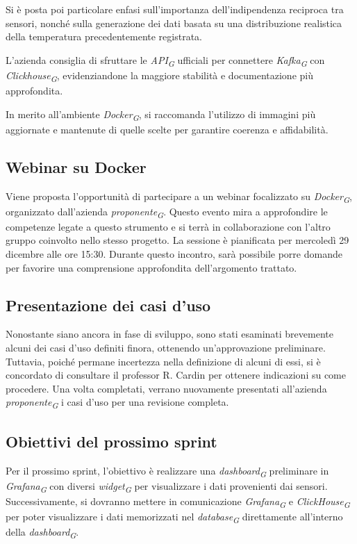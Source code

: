 \documentclass{article}
\begin{document}
Si è posta poi particolare enfasi sull'importanza dell'indipendenza reciproca tra sensori, nonché sulla generazione dei dati basata su una distribuzione realistica della temperatura precedentemente registrata.  

L'azienda consiglia di sfruttare le \textit{API}\textsubscript{\textit{G}} ufficiali per connettere \textit{Kafka}\textsubscript{\textit{G}} con \textit{Clickhouse}\textsubscript{\textit{G}}, evidenziandone la maggiore stabilità e documentazione più approfondita.  

In merito all'ambiente \textit{Docker}\textsubscript{\textit{G}}, si raccomanda l'utilizzo di immagini più aggiornate e mantenute di quelle scelte per garantire coerenza e affidabilità.  

\subsection{Webinar su Docker}
Viene proposta l'opportunità di partecipare a un webinar focalizzato su \textit{Docker}\textsubscript{\textit{G}}, organizzato dall'azienda \textit{proponente}\textsubscript{\textit{G}}. Questo evento mira a approfondire le competenze legate a questo strumento e si terrà in collaborazione con l'altro gruppo coinvolto nello stesso progetto.  
La sessione è pianificata per mercoledì 29 dicembre alle ore 15:30. Durante questo incontro, sarà possibile porre domande per favorire una comprensione approfondita dell'argomento trattato. 

\subsection{Presentazione dei casi d'uso}
Nonostante siano ancora in fase di sviluppo, sono stati esaminati brevemente alcuni dei casi d'uso definiti finora, ottenendo un'approvazione preliminare.
Tuttavia, poiché permane incertezza nella definizione di alcuni di essi, si è concordato di consultare il professor R. Cardin per ottenere indicazioni su come procedere.  
Una volta completati, verrano nuovamente presentati all'azienda \textit{proponente}\textsubscript{\textit{G}} i casi d'uso per una revisione completa.  

\subsection{Obiettivi del prossimo sprint}
Per il prossimo sprint, l'obiettivo è realizzare una \textit{dashboard}\textsubscript{\textit{G}} preliminare in \textit{Grafana}\textsubscript{\textit{G}} con diversi \textit{widget}\textsubscript{\textit{G}} per visualizzare i dati provenienti dai sensori. Successivamente, si dovranno mettere in comunicazione \textit{Grafana}\textsubscript{\textit{G}} e \textit{ClickHouse}\textsubscript{\textit{G}} per poter visualizzare i dati memorizzati nel \textit{database}\textsubscript{\textit{G}} direttamente all'interno della \textit{dashboard}\textsubscript{\textit{G}}.  
\end{document}
